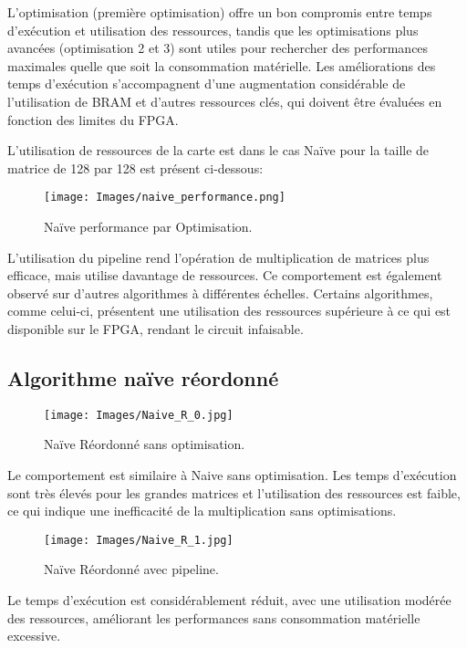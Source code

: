 \documentclass[../CSC_5RO06_TA.tex]{subfiles}
\begin{document}
L'optimisation (première optimisation) offre un bon compromis entre temps d'exécution et utilisation des ressources, tandis que les optimisations plus avancées (optimisation 2 et 3) sont utiles pour rechercher des performances maximales quelle que soit la consommation matérielle. Les améliorations des temps d'exécution s'accompagnent d'une augmentation considérable de l'utilisation de BRAM et d'autres ressources clés, qui doivent être évaluées en fonction des limites du FPGA.

L'utilisation de ressources de la carte est dans le cas Naïve pour la taille de matrice de 128 par 128 est présent ci-dessous:
\begin{figure}[H]
    \centering
    \texttt{[image: Images/naive\_performance.png]}
    \caption{Naïve performance par Optimisation.}
    \label{fig:4}
\end{figure}
L'utilisation du pipeline rend l'opération de multiplication de matrices plus efficace, mais utilise davantage de ressources. Ce comportement est également observé sur d'autres algorithmes à différentes échelles. Certains algorithmes, comme celui-ci, présentent une utilisation des ressources supérieure à ce qui est disponible sur le FPGA, rendant le circuit infaisable.



\subsection{Algorithme naïve réordonné}

\begin{figure}[H]
    \centering
    \texttt{[image: Images/Naive\_R\_0.jpg]}
    \caption{Naïve Réordonné sans optimisation.}
    \label{fig:5}
\end{figure}

Le comportement est similaire à Naive sans optimisation. Les temps d'exécution sont très élevés pour les grandes matrices et l'utilisation des ressources est faible, ce qui indique une inefficacité de la multiplication sans optimisations.

\begin{figure}[H]
    \centering
    \texttt{[image: Images/Naive\_R\_1.jpg]}
    \caption{Naïve Réordonné avec pipeline.}
    \label{fig:6}
\end{figure}

Le temps d'exécution est considérablement réduit, avec une utilisation modérée des ressources, améliorant les performances sans consommation matérielle excessive.
\end{document}
